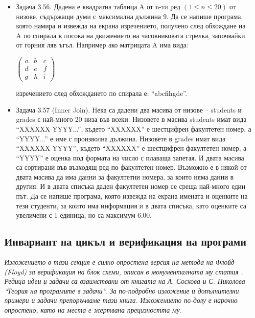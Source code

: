{\begin{itemize}[resume]
  \item Задача 3.56. \cite{sbornik} Дадена е квадратна таблица A от n-ти ред $(1 \le n \le 20)$ от низове, съдържащи думи с максимална дължина 9. Да се напише програма, която намира и извежда на екрана изречението, получено след обхождане на A по спирала в посока на движението на часовниковата стрелка, започвайки от горния ляв ъгъл. Например ако матрицата A има вида:

  $\left( \begin{array}{ccc}
  a & b & c \\
  d & e & f \\
  g & h & i
  \end{array} \right)$

  изречението след обхождането по спирала е: ``abcfihgde''.

  \item Задача 3.57 (Inner Join). \cite{sbornik} Нека са дадени два масива от низове – students и grades с най-много 20 низа във всеки. Низовете в масива students имат вида ``XXXXXX YYYY...'', където ``XXXXXX'' е шестцифрен факултетен номер, а ``YYYY...'' е име с произволна дължина. Низовете в grades имат вида ``XXXXXX YYYY'', където ``XXXXXX'' е шестцифрен факултетен номер, а ``YYYY'' е оценка под формата на число с плаваща запетая. И двата масива са сортирани във възходящ ред по факултетен номер. Възможно е в някой от двата масива да има данни за факултетни номера, за които няма данни в другия. И в двата списъка даден факултетен номер се среща най-много един път. Да се напише програма, която извежда на екрана имената и оценките на тези студенти, за които има информация и в двата списъка, като оценките са увеличени с 1 единица, но са максимум 6.00.

\end{itemize}

\subsection{Инвариант на цикъл и верификация на програми}

\emph{Изложението в тази секция е силно опростена версия на метода на Флойд (Floyd) за верификация на блок схеми, описан в монументалната му статия \cite{floyd}. Редица идеи и задачи са взаимствани от книгата \cite{tpsbornik} на А. Соскова и С. Николова ``Теория на програмите в задачи''. За по-подробно изложение и допълнителни примери и задачи препоръчваме тази книга. Изложението по-долу е нарочно опростено, като на места е жертвана прецизността му.}

}
